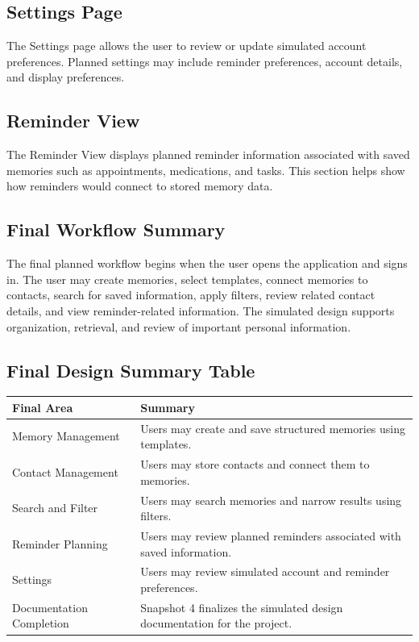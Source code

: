 \documentclass{article}
\begin{document}
\subsection{Settings Page}

The Settings page allows the user to review or update simulated account preferences. Planned settings may include reminder preferences, account details, and display preferences.

\subsection{Reminder View}

The Reminder View displays planned reminder information associated with saved memories such as appointments, medications, and tasks. This section helps show how reminders would connect to stored memory data.

\subsection{Final Workflow Summary}

The final planned workflow begins when the user opens the application and signs in. The user may create memories, select templates, connect memories to contacts, search for saved information, apply filters, review related contact details, and view reminder-related information. The simulated design supports organization, retrieval, and review of important personal information.

\subsection{Final Design Summary Table}

\begin{longtable}{|p{4cm}|p{9cm}|}
\hline
Final Area & Summary \\ \hline
Memory Management & Users may create and save structured memories using templates. \\ \hline
Contact Management & Users may store contacts and connect them to memories. \\ \hline
Search and Filter & Users may search memories and narrow results using filters. \\ \hline
Reminder Planning & Users may review planned reminders associated with saved information. \\ \hline
Settings & Users may review simulated account and reminder preferences. \\ \hline
Documentation Completion & Snapshot 4 finalizes the simulated design documentation for the project. \\ \hline
\end{longtable}
\end{document}
